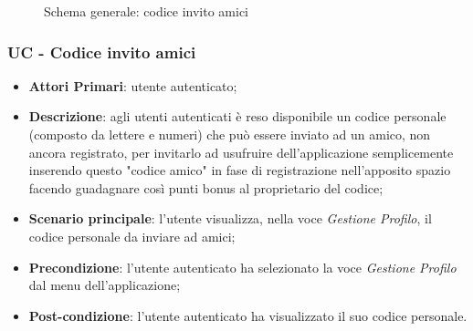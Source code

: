 \begin{figure}[h]
	\centering
	\caption{Schema generale: codice invito amici}
\end{figure}
\subsubsection{UC - Codice invito amici}
\begin{itemize}
	\item \textbf{Attori Primari}: utente autenticato;
	\item \textbf{Descrizione}: agli utenti autenticati è reso disponibile un codice personale (composto da lettere e numeri) che può essere inviato ad un amico, non ancora registrato, per invitarlo ad usufruire dell'applicazione semplicemente inserendo questo "codice amico" in fase di registrazione nell'apposito spazio facendo guadagnare così punti bonus al proprietario del codice;
	\item \textbf{Scenario principale}: l'utente visualizza, nella voce \textit{Gestione Profilo}, il codice personale da inviare ad amici;
	\item \textbf{Precondizione}: l'utente autenticato ha selezionato la voce \textit{Gestione Profilo} dal menu dell'applicazione;
	\item \textbf{Post-condizione}: l'utente autenticato ha visualizzato il suo codice personale. 
\end{itemize} 
